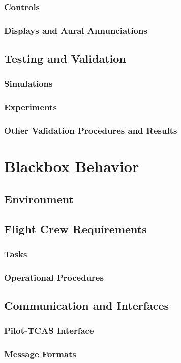 \documentclass[12pt]{report}
\begin{document}
\subsection{Controls}
\subsection{Displays and Aural Annunciations}
\section{Testing and Validation}
\subsection{Simulations}
\subsection{Experiments}
\subsection{Other Validation Procedures and Results}

\chapter{Blackbox Behavior}
\section{Environment}
\section{Flight Crew Requirements}
\subsection{Tasks}
\subsection{Operational Procedures}
\section{Communication and Interfaces}
\subsection{Pilot-TCAS Interface}
\subsection{Message Formats}
\end{document}

